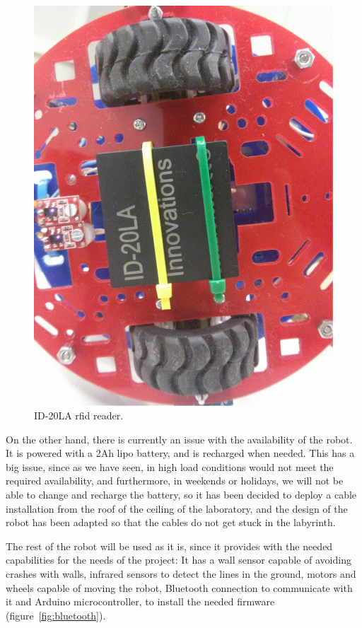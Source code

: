 \begin{figure}[!htbp]
	\centering
	\includegraphics[width=0.3\textheight, angle=-90]{fig/rfid}
	\caption{ID-20LA \acrshort{rfid} reader.}
	\label{fig:rfid}
\end{figure}

On the other hand, there is currently an issue with the availability of the robot. It is powered
with a 2Ah \acrshort{lipo} battery, and is recharged when needed. This has a big issue, since as we
have seen, in high load conditions would not meet the required availability, and furthermore, in
weekends or holidays, we will not be able to change and recharge the battery, so it has been decided
to deploy a cable installation from the roof of the ceiling of the laboratory, and the design of the
robot has been adapted so that the cables do not get stuck in the labyrinth.

The rest of the robot will be used as it is, since it provides with the needed capabilities for the
needs of the project: It has a wall sensor capable of avoiding crashes with walls, infrared sensors
to detect the lines in the ground, motors and wheels capable of moving the robot, Bluetooth
connection to communicate with it and Arduino microcontroller, to install the needed firmware
(figure~\ref{fig:bluetooth}).


